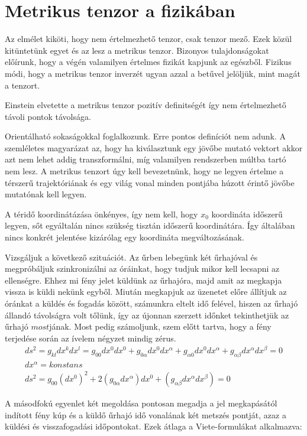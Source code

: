 \documentclass[a4paper, 12pt]{article}
\begin{document}
\section{Metrikus tenzor a fizikában}
\par Az elmélet kiköti, hogy nem értelmezhető tenzor, csak tenzor mező. Ezek közül kitüntetünk egyet és az lesz a metrikus tenzor. Bizonyos tulajdonságokat előírunk, hogy a végén valamilyen értelmes fizikát kapjunk az egészből. Fizikus módi, hogy a metrikus tenzor inverzét ugyan azzal a betűvel jelöljük, mint magát a tenzort. 
\par Einstein elvetette a metrikus tenzor pozitív definitségét így nem értelmezhető távoli pontok távolsága. 
\par Orientálható sokaságokkal foglalkozunk. Erre pontos definíciót nem adunk. A szemléletes magyarázat az, hogy ha kiválasztunk egy jövőbe mutató vektort akkor azt nem lehet addig transzformálni, míg valamilyen rendszerben múltba tartó nem lesz. A metrikus tenzort úgy kell bevezetnünk, hogy ne legyen értelme a térszerű trajektóriának és egy világ vonal minden pontjába húzott érintő  jövőbe mutatónak kell legyen. 
\par A téridő koordinátázása önkényes, így nem kell, hogy $x_0$ koordináta időszerű legyen, sőt egyáltalán nincs szükség tisztán időszerű koordinátára. Így általában nincs konkrét jelentése kizárólag egy koordináta megváltozásának.
\par Vizsgáljuk a következő szituációt. Az űrben lebegünk két űrhajóval és megpróbáljuk szinkronizálni az óráinkat, hogy tudjuk mikor kell lecsapni az ellenségre. Ehhez mi fény jelet küldünk az űrhajóra, majd amit az megkapja vissza is küldi nekünk egyből. Miután megkapjuk az üzenetet előre állítjuk az óránkat a küldés és fogadás között, számunkra eltelt idő felével, hiszen az űrhajó állandó távolságra volt tőlünk, így az újonnan szerzett időnket tekinthetjük az űrhajó $most$jának. Most pedig számoljunk, szem előtt tartva, hogy a fény terjedése során az ívelem négyzet mindig zérus.
\begin{gather*}
    ds^{2} = g_{kl}dx^{k}dx^{l} = g_{00}dx^{0}dx^{0} + g_{0\alpha}dx^{0}dx^{\alpha} + g_{\alpha 0}dx^{0}dx^{\alpha} +
    g_{\alpha\beta}dx^{\alpha}dx^{\beta} = 0 \\
    dx^{\alpha} = konstans \\
    ds^{2} = g_{00}(dx^{0})^{2} + 2(g_{0\alpha}dx^{\alpha})dx^{0} + (g_{\alpha\beta} dx^{\alpha}dx^{\beta}) = 0
\end{gather*}
\par A másodfokú egyenlet két megoldása pontosan megadja a jel megkapásától indított fény kúp és a küldő űrhajó idő vonalának két metszés pontját, azaz a küldési és visszafogadási időpontokat. Ezek átlaga a Viete-formulákat alkalmazva:
\end{document}
